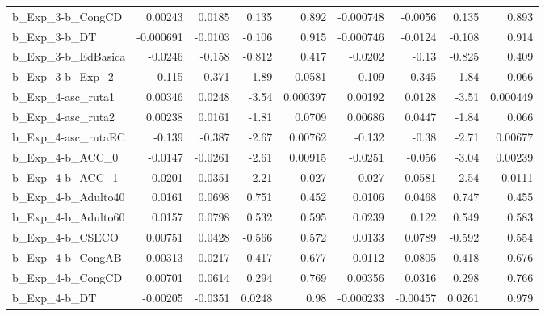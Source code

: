 \begin{tabular}{lrrrrrrrr}
b\_Exp\_3-b\_CongCD           &     0.00243 &       0.0185 &     0.135 &    0.892 &  -0.000748 &     -0.0056 &        0.135 &         0.893 \\
b\_Exp\_3-b\_DT               &   -0.000691 &      -0.0103 &    -0.106 &    0.915 &  -0.000746 &     -0.0124 &       -0.108 &         0.914 \\
b\_Exp\_3-b\_EdBasica         &     -0.0246 &       -0.158 &    -0.812 &    0.417 &    -0.0202 &       -0.13 &       -0.825 &         0.409 \\
b\_Exp\_3-b\_Exp\_2            &       0.115 &        0.371 &     -1.89 &   0.0581 &      0.109 &       0.345 &        -1.84 &         0.066 \\
b\_Exp\_4-asc\_ruta1          &     0.00346 &       0.0248 &     -3.54 & 0.000397 &    0.00192 &      0.0128 &        -3.51 &      0.000449 \\
b\_Exp\_4-asc\_ruta2          &     0.00238 &       0.0161 &     -1.81 &   0.0709 &    0.00686 &      0.0447 &        -1.84 &         0.066 \\
b\_Exp\_4-asc\_rutaEC         &      -0.139 &       -0.387 &     -2.67 &  0.00762 &     -0.132 &       -0.38 &        -2.71 &       0.00677 \\
b\_Exp\_4-b\_ACC\_0            &     -0.0147 &      -0.0261 &     -2.61 &  0.00915 &    -0.0251 &      -0.056 &        -3.04 &       0.00239 \\
b\_Exp\_4-b\_ACC\_1            &     -0.0201 &      -0.0351 &     -2.21 &    0.027 &     -0.027 &     -0.0581 &        -2.54 &        0.0111 \\
b\_Exp\_4-b\_Adulto40         &      0.0161 &       0.0698 &     0.751 &    0.452 &     0.0106 &      0.0468 &        0.747 &         0.455 \\
b\_Exp\_4-b\_Adulto60         &      0.0157 &       0.0798 &     0.532 &    0.595 &     0.0239 &       0.122 &        0.549 &         0.583 \\
b\_Exp\_4-b\_CSECO            &     0.00751 &       0.0428 &    -0.566 &    0.572 &     0.0133 &      0.0789 &       -0.592 &         0.554 \\
b\_Exp\_4-b\_CongAB           &    -0.00313 &      -0.0217 &    -0.417 &    0.677 &    -0.0112 &     -0.0805 &       -0.418 &         0.676 \\
b\_Exp\_4-b\_CongCD           &     0.00701 &       0.0614 &     0.294 &    0.769 &    0.00356 &      0.0316 &        0.298 &         0.766 \\
b\_Exp\_4-b\_DT               &    -0.00205 &      -0.0351 &    0.0248 &     0.98 &  -0.000233 &    -0.00457 &       0.0261 &         0.979 \\

\end{tabular}
